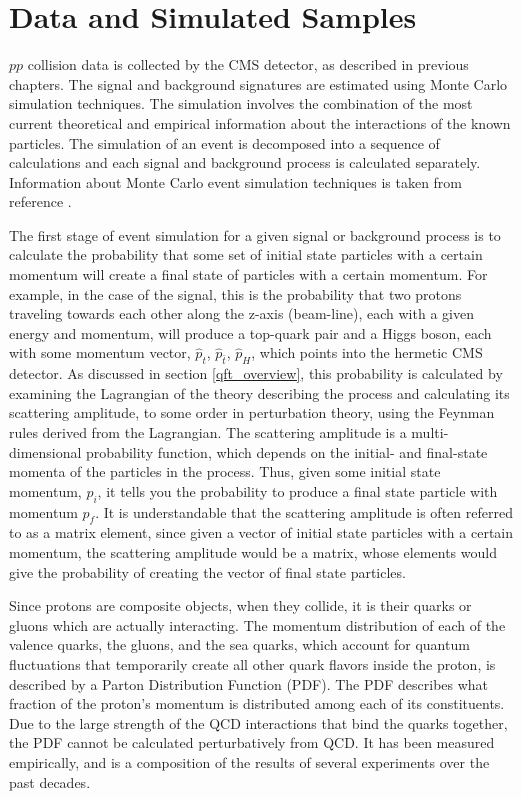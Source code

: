 \section{Data and Simulated Samples}
\label{data_and_mc_overview}

\par $pp$ collision data is collected by the CMS detector, as
described in previous chapters.  The signal and background signatures
are estimated using Monte Carlo simulation techniques.  The simulation
involves the combination of the most current theoretical and empirical
information about the interactions of the known particles.  The
simulation of an event is decomposed into a sequence of calculations and
each signal and background process is calculated separately.
Information about Monte Carlo event simulation techniques is taken
from reference \cite{Agashe:2014kda}.  

\par The first stage of event simulation for a given signal or
background process is to calculate the probability that some set
of initial state particles with a certain momentum will create a final
state of particles with a certain momentum.  For example, in the case of
the \ttH signal, this is the probability that two protons traveling
towards each other along the z-axis (beam-line), each with a given
energy and momentum, will produce a top-quark pair and a Higgs boson,
each with some momentum vector, $\hat{p}_{t}$, $\hat{p}_{\bar{t}}$,
$\hat{p}_{H}$, which points into the hermetic CMS detector.  As
discussed in section \ref{qft_overview}, this probability is calculated
by examining the Lagrangian of the theory describing the process and
calculating its scattering amplitude, to some order in perturbation
theory, using the Feynman rules derived from the Lagrangian.  The
scattering amplitude is a multi-dimensional probability function,
which depends on the initial- and final-state momenta of the particles
in the process.  Thus, given some initial state momentum, $p_{i}$, it tells you
the probability to produce a final state particle with momentum
$p_{f}$.  It is understandable that the scattering amplitude is
often referred to as a matrix element, since given a vector of initial
state particles with a certain momentum, the scattering amplitude
would be a matrix, whose elements would give the probability of
creating the vector of final state particles.  

\par Since protons are composite objects, when they
collide, it is their quarks or gluons which are actually interacting.
The momentum distribution of each of the valence quarks, the gluons,
and the sea quarks, which account for quantum fluctuations that
temporarily create all other quark flavors inside the proton, is described by
a Parton Distribution Function (PDF).  The PDF describes what fraction
of the proton's momentum is distributed among each of its
constituents.  Due to the large strength of the QCD interactions that
bind the quarks together, the PDF cannot be calculated perturbatively
from QCD.  It has been measured empirically, and is a composition of the
results of several experiments over the past decades.  


